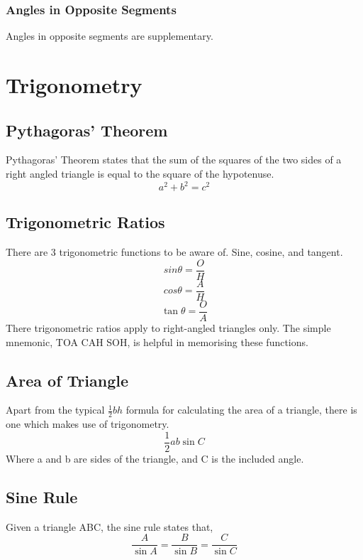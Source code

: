 \documentclass{report}
\begin{document}
\begin{flushleft}
\subsubsection{Angles in Opposite Segments}
Angles in opposite segments are supplementary.

\section{Trigonometry}
\subsection{Pythagoras' Theorem}
Pythagoras' Theorem states that the sum of the squares of the two sides of a right angled triangle is equal to the square of the hypotenuse.
\begin{equation}
a^2+b^2=c^2
\end{equation}

\subsection{Trigonometric Ratios}
There are 3 trigonometric functions to be aware of. Sine, cosine, and tangent. 
\begin{equation}
sin{\theta}= \frac{O}{H}
\end{equation}
\begin{equation}
cos{\theta} = \frac{A}{H}
\end{equation}
\begin{equation}
\tan{\theta} = \frac{O}{A}
\end{equation}
There trigonometric ratios apply to right-angled triangles only. The simple mnemonic, TOA CAH SOH, is helpful in memorising these functions. 

\subsection{Area of Triangle}
Apart from the typical $\frac{1}{2}bh$ formula for calculating the area of a triangle, there is one which makes use of trigonometry.
\begin{equation}
\frac{1}{2}ab \sin{C}
\end{equation}
Where a and b are sides of the triangle, and C is the included angle.

\subsection{Sine Rule}
Given a triangle ABC, the sine rule states that,
\begin{equation}
\frac{A}{\sin{A}} = \frac{B}{\sin{B}} = \frac{C}{\sin{C}}
\end{equation}


\end{flushleft}
\end{document}
